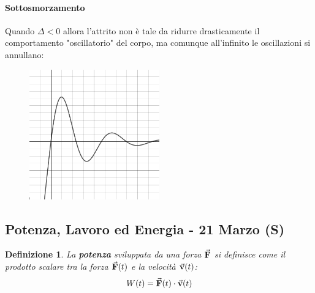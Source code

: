 \documentclass{article}
\newtheorem{defn}{Definizione}[section]
\renewcommand{\v}{\va{v}}
\newcommand{\F}{\va{F}}
\begin{document}
\paragraph{Sottosmorzamento}
Quando $\Delta<0$ allora l'attrito non è tale da ridurre drasticamente il comportamento "oscillatorio" del corpo, ma comunque all'infinito le oscillazioni si annullano:
\begin{figure}
    \centering
    \includegraphics[width=0.5\textwidth]{Appunti/SottoSmorzamento.png}
    \label{sottosmorz}
\end{figure}


\subsection{Potenza, Lavoro ed Energia - 21 Marzo (S)}
\begin{defn}
La \textbf{potenza} sviluppata da una forza $\F$ si definisce come il prodotto scalare tra la forza $\F(t)$ e la velocità $\v(t)$:
\[W(t)=\F(t)\cdot\v(t)\]
\end{defn}
\end{document}
